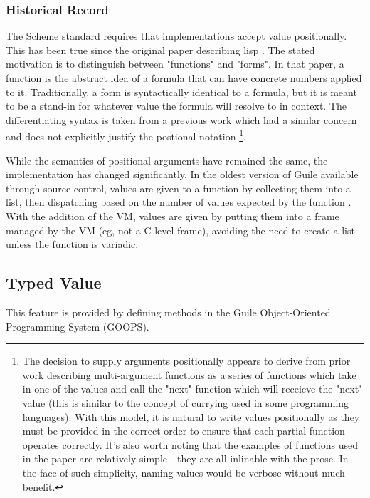\subsubsection{Historical Record}
The Scheme standard requires that implementations accept value positionally.
This has been true since the original paper describing lisp
\parencite[][pages 185-186]{original-lisp-paper-pt-1}.
The stated motivation is to distinguish between "functions" and "forms".
In that paper, a function is the abstract idea of a formula that can have concrete numbers
applied to it.
Traditionally, a form is syntactically identical to a formula, but it is meant to be a
stand-in for whatever value the formula will resolve to in context.
The differentiating syntax is taken from a previous work which had a similar concern and
does not explicitly justify the postional notation
\parencite[][pages 3-7]{calculi-of-lambda-conversion}
\footnote{
	The decision to supply arguments positionally appears to derive from prior work
	describing multi-argument functions as a series of functions which take in one of the
	values and call the "next" function which will receieve the "next" value (this is
	similar to the concept of currying used in some programming languages).
	With this model, it is natural to write values positionally as they must be provided in
	the correct order to ensure that each partial function operates correctly.
	It's also worth noting that the examples of functions used in the paper are relatively
	simple - they are all inlinable with the prose.
	In the face of such simplicity, naming values would be verbose without much benefit.
}.

While the semantics of positional arguments have remained the same, the implementation
has changed significantly.
In the oldest version of Guile available through source control, values are given to
a function by collecting them into a list, then dispatching based on the number of
values expected by the function
\parencite[][libguile/eval.c lines 1822-2004]{guile-first-commit}.
With the addition of the VM, values are given by putting them into a frame managed by the
VM (eg, not a C-level frame), avoiding the need to create a list unless the function is
variadic.

\subsection{Typed Value}
This feature is provided by defining methods in the Guile Object-Oriented Programming
System (GOOPS).

